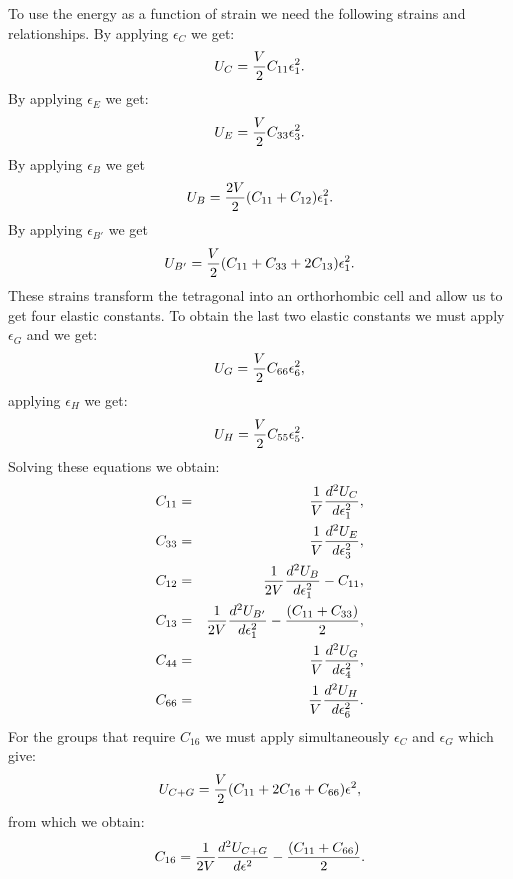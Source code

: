 \documentclass[12pt,a4paper]{article}
\begin{document}
To use the energy as a function of strain 
we need the following strains and relationships. 
By applying $\epsilon_C$ we get:
\begin{equation}
U_C= {V \over 2} C_{11} \epsilon_1^2.
\end{equation}
By applying $\epsilon_E$ we get:
\begin{equation}
U_E= {V \over 2} C_{33} \epsilon_3^2.
\end{equation}
By applying $\epsilon_B$ we get
\begin{equation}
U_B= {2 V \over 2} (C_{11} + C_{12}) \epsilon_1^2.
\end{equation}
By applying $\epsilon_{B'}$ we get
\begin{equation}
U_{B'}= {V \over 2} (C_{11} + C_{33} + 2 C_{13}) \epsilon_1^2.
\end{equation}
These strains transform the tetragonal into an orthorhombic cell 
and allow us to get four elastic constants. 
To obtain the last two elastic constants we 
must apply $\epsilon_G$ and we get:
\begin{equation}
U_G= {V \over 2} C_{66} \epsilon_6^2,
\end{equation}
applying $\epsilon_H$ we get:
\begin{equation}
U_H= {V \over 2} C_{55} \epsilon_5^2.
\end{equation}
Solving these equations we obtain:
\begin{eqnarray}
C_{11}&=&{1 \over V} {d^2 U_C \over d \epsilon_1^2}, \\ 
C_{33}&=&{1 \over V} {d^2 U_E \over d \epsilon_3^2}, \\ 
C_{12}&=&{1 \over 2 V} {d^2 U_B \over d \epsilon_1^2} - C_{11}, \\
C_{13}&=&{1 \over 2 V} {d^2 U_{B'} \over d \epsilon_1^2} - 
{(C_{11} +C_{33})\over 2}, \\
C_{44}&=&{1 \over V} {d^2 U_G \over d \epsilon_4^2}, \\
C_{66}&=&{1 \over V} {d^2 U_H \over d \epsilon_6^2}.
\end{eqnarray}
For the groups that require $C_{16}$ we must apply simultaneously $\epsilon_C$
and $\epsilon_G$ which give:
\begin{equation}
U_{C+G}={V \over 2} (C_{11}+2C_{16}+C_{66})\epsilon^2,
\end{equation}
from which we obtain:
\begin{equation}
C_{16}={1 \over 2V} {d^2 U_{C+G} \over d \epsilon^2} - {(C_{11}+C_{66})\over 2}.
\end{equation}
\end{document}
